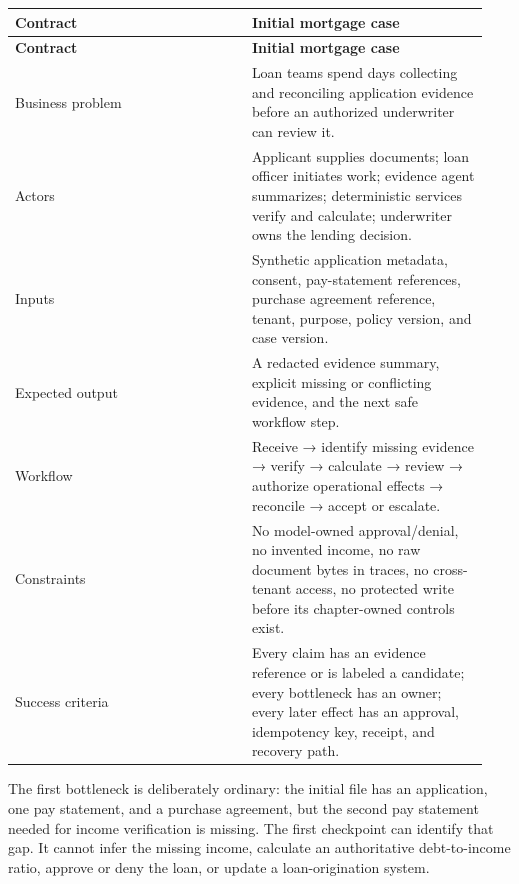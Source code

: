 \BookTableStart
\small
\begin{longtable}{@{}Y{0.4700\linewidth}Y{0.4700\linewidth}@{}}
\color{white}\bfseries Contract & \color{white}\bfseries Initial mortgage case \\
\endfirsthead
{}
\color{white}\bfseries Contract & \color{white}\bfseries Initial mortgage case \\
\endhead
Business problem & Loan teams spend days collecting and reconciling application evidence before an authorized underwriter can review it. \\
Actors & Applicant supplies documents; loan officer initiates work; evidence agent summarizes; deterministic services verify and calculate; underwriter owns the lending decision. \\
Inputs & Synthetic application metadata, consent, pay-statement references, purchase agreement reference, tenant, purpose, policy version, and case version. \\
Expected output & A redacted evidence summary, explicit missing or conflicting evidence, and the next safe workflow step. \\
Workflow & Receive → identify missing evidence → verify → calculate → review → authorize operational effects → reconcile → accept or escalate. \\
Constraints & No model-owned approval/denial, no invented income, no raw document bytes in traces, no cross-tenant access, no protected write before its chapter-owned controls exist. \\
Success criteria & Every claim has an evidence reference or is labeled a candidate; every bottleneck has an owner; every later effect has an approval, idempotency key, receipt, and recovery path. \\
\end{longtable}
\BookTableEnd

The first bottleneck is deliberately ordinary: the initial file has an application, one pay statement, and a purchase agreement, but the second pay statement needed for income verification is missing. The first checkpoint can identify that gap. It cannot infer the missing income, calculate an authoritative debt-to-income ratio, approve or deny the loan, or update a loan-origination system.\par



